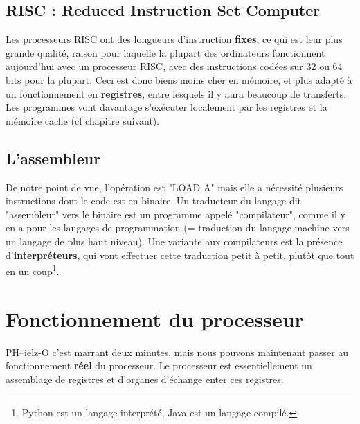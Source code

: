 \documentclass[12pt,a4paper]{report}
\begin{document}
\subsection{RISC : Reduced Instruction Set Computer}
Les processeurs RISC ont des longueurs d'instruction \textbf{fixes}, ce qui est leur plus grande qualité, raison pour laquelle la plupart des ordinateurs fonctionnent aujourd'hui avec un processeur RISC, avec des instructions codées sur 32 ou 64 bits pour la plupart. Ceci est donc biens moins cher en mémoire, et plus adapté à un fonctionnement en \textbf{registres}, entre lesquels il y aura beaucoup de transferts. Les programmes vont davantage s'exécuter localement par les registres et la mémoire cache (cf chapitre suivant).
\subsection{L'assembleur}
De notre point de vue, l'opération est "LOAD A" mais elle a nécessité plusieurs instructions dont le code est en binaire. Un traducteur du langage dit "assembleur" vers le binaire est un programme appelé "compilateur", comme il y en a pour les langages de programmation (= traduction du langage machine vers un langage de plus haut niveau). Une variante aux compilateurs est la présence d'\textbf{interpréteurs}, qui vont effectuer cette traduction petit à petit, plutôt que tout en un coup\footnote{Python est un langage interprété, Java est un langage compilé.}.
\section{Fonctionnement du processeur}
PH--ielz-O c'est marrant deux minutes, mais nous pouvons maintenant passer au fonctionnement \textbf{réel} du processeur. Le processeur est essentiellement un assemblage de registres et d'organes d'échange enter ces registres.
\end{document}
